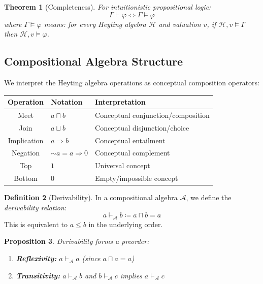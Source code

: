 \documentclass[12pt,a4paper]{article}
\theoremstyle{definition}
\newtheorem{definicao}{Definition}[section]
\theoremstyle{plain}
\newtheorem{teorema}[definicao]{Theorem}
\newtheorem{proposicao}[definicao]{Proposition}
\theoremstyle{remark}
\newcommand{\defeq}{\coloneqq}
\begin{document}
\begin{teorema}[Completeness]
For intuitionistic propositional logic:
$$
\Gamma \vdash \varphi \iff \Gamma \models \varphi
$$
where $\Gamma \models \varphi$ means: for every Heyting algebra $\mathcal{H}$ and valuation $v$, if $\mathcal{H}, v \models \Gamma$ then $\mathcal{H}, v \models \varphi$.
\end{teorema}

\subsection{Compositional Algebra Structure}

We interpret the Heyting algebra operations as conceptual composition operators:

\begin{center}
\begin{tabular}{cll}
    \textbf{Operation} & \textbf{Notation} & \textbf{Interpretation} \\
    \hline
    Meet & $a \sqcap b$ & Conceptual conjunction/composition \\
    Join & $a \sqcup b$ & Conceptual disjunction/choice \\
    Implication & $a \Rightarrow b$ & Conceptual entailment \\
    Negation & $\sim a = a \Rightarrow 0$ & Conceptual complement \\
    Top & $1$ & Universal concept \\
    Bottom & $0$ & Empty/impossible concept \\
\end{tabular}
\end{center}

\begin{definicao}[Derivability]
In a compositional algebra $\mathcal{A}$, we define the \emph{derivability relation}:
$$
a \vdash_{\mathcal{A}} b \defeq a \sqcap b = a
$$
This is equivalent to $a \leq b$ in the underlying order.
\end{definicao}

\begin{proposicao}
Derivability forms a preorder:
\begin{enumerate}
    \item \textbf{Reflexivity:} $a \vdash_{\mathcal{A}} a$ (since $a \sqcap a = a$)
    \item \textbf{Transitivity:} $a \vdash_{\mathcal{A}} b$ and $b \vdash_{\mathcal{A}} c$ implies $a \vdash_{\mathcal{A}} c$
\end{enumerate}
\end{proposicao}
\end{document}
